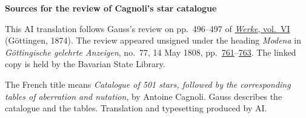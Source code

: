 \clearpage\thispagestyle{empty}
\begin{center}\textbf{Sources for the review of Cagnoli’s star catalogue}\end{center}
\noindent This AI translation follows Gauss’s review on pp.~496--497 of \href{https://gdz.sub.uni-goettingen.de/id/PPN236007467}{\textit{Werke}, vol.~VI} (Göttingen, 1874). The review appeared unsigned under the heading \emph{Modena} in \textit{Göttingische gelehrte Anzeigen}, no.~77, 14 May 1808, pp.~\href{https://api.digitale-sammlungen.de/iiif/image/v2/bsb10538673_00767/full/1800,/0/default.jpg}{761}--\href{https://api.digitale-sammlungen.de/iiif/image/v2/bsb10538673_00769/full/1800,/0/default.jpg}{763}. The linked copy is held by the Bavarian State Library.
\par\smallskip\noindent The French title means \emph{Catalogue of 501 stars, followed by the corresponding tables of aberration and nutation}, by Antoine Cagnoli. Gauss describes the catalogue and the tables. Translation and typesetting produced by AI.
\clearpage
